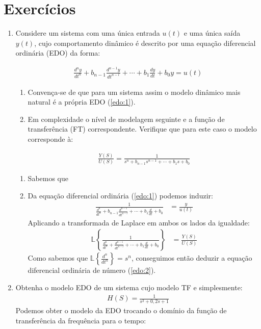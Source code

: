 \documentclass[12pt,a4paper]{article}
\begin{document}
\section*{Exercícios}
\begin{enumerate}
  \item Considere um sistema com uma única entrada $u(t)$ e uma única saída $y(t)$, 
    cujo comportamento dinâmico é descrito por uma equação diferencial ordinária 
    (EDO) da forma:

    \begin{align}
      \label{edo:1}
      \frac{d^n y}{dt^n}+b_{n-1}\frac{d^{n-1} y}{dt^{n-l}}+\cdots+b_1 \frac{dy}{dt}+b_0 y = u(t)
    \end{align}
\begin{enumerate}[label=(\alph*)]
  \item Convença-se de que para um sistema assim o modelo dinâmico mais natural 
é a própria EDO (\ref{edo:1}).
\item Em complexidade o nível de modelagem seguinte e a função de transferência 
(FT) correspondente. Verifique que para este caso o modelo corresponde à:

\begin{align}
  \label{edo:2}
  \frac{Y(S)}{U(S)}= \frac{1}{s^n + b_{n-1}s^{n-1}+\cdots+b_1 s+ b_0}
\end{align}

  \end{enumerate}

\begin{enumerate}[label=(\alph*)]
  \item Sabemos que 
  \item Da equação diferencial ordinária (\ref{edo:1}) podemos induzir:
    \begin{align*}
      \frac{1}{\frac{d^n}{dt^n}+b_{n-1}\frac{d^{n-1} }{dt^{n-l}}+\cdots+b_1 \frac{d}{dt}+b_0}  &= \frac{y}{u(t)}
    \end{align*}
    Aplicando a transformada de Laplace em ambos os lados da igualdade:
    \begin{align*}
      \mathbb{L}\left\{ \frac{1}{\frac{d^n}{dt^n}+\frac{d^{n-1}}{dt^{n-l}}+\cdots+b_1 \frac{d}{dt}+b_0} \right\}  &= \frac{Y(S)}{U(S)}
    \end{align*}
    Como sabemos que $\mathbb{L}\left\{\frac{d^n}{dt^n}\right\}=s^n$, conseguimos então
    deduzir a equação diferencial ordinária de número (\ref{edo:2}).
\end{enumerate}
\item Obtenha o modelo EDO de um sistema cujo modelo TF e simplesmente:
  \begin{align}
    \label{edo:3}
    H(S)=\frac{1}{s^2 + 0,2s+1}
  \end{align}
  Podemos obter o modelo da EDO trocando o domínio da função de transferência da
  frequência para o tempo:


\end{enumerate}
\end{document}

